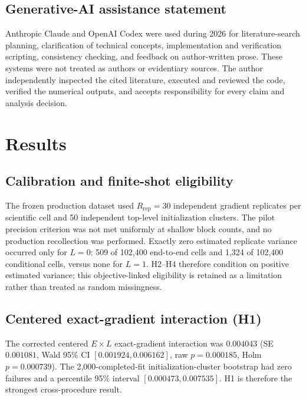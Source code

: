 \documentclass[pdflatex,sn-basic,Numbered]{sn-jnl}
\begin{document}
\subsection{Generative-AI assistance statement}

Anthropic Claude and OpenAI Codex were used during 2026 for literature-search planning, clarification of technical concepts, implementation and verification scripting, consistency checking, and feedback on author-written prose. These systems were not treated as authors or evidentiary sources. The author independently inspected the cited literature, executed and reviewed the code, verified the numerical outputs, and accepts responsibility for every claim and analysis decision.

\section{Results}

\subsection{Calibration and finite-shot eligibility}\label{sec:results-calibration}\label{sec:zero-variance-sensitivity}

The frozen production dataset used $R_{\mathrm{rep}}=30$ independent gradient replicates per scientific cell and 50 independent top-level initialization clusters. The pilot precision criterion was not met uniformly at shallow block counts, and no production recollection was performed. Exactly zero estimated replicate variance occurred only for $L=0$: 509 of 102,400 end-to-end cells and 1,324 of 102,400 conditional cells, versus none for $L=1$. H2--H4 therefore condition on positive estimated variance; this objective-linked eligibility is retained as a limitation rather than treated as random missingness.

\subsection{Centered exact-gradient interaction (H1)}\label{sec:h1-result}

The corrected centered $E\times L$ exact-gradient interaction was $0.004043$ (SE $0.001081$, Wald 95\% CI $[0.001924,0.006162]$, raw $p=0.000185$, Holm $p=0.000739$). The 2,000-completed-fit initialization-cluster bootstrap had zero failures and a percentile 95\% interval $[0.000473,0.007535]$. H1 is therefore the strongest cross-procedure result.
\end{document}
